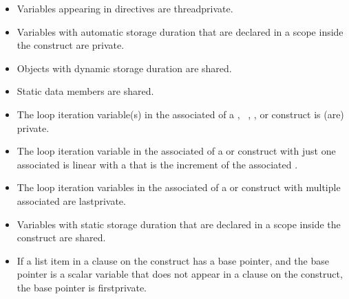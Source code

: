 \begin{ccppspecific}
\begin{itemize}
\item Variables appearing in  directives are threadprivate.

\item Variables with automatic storage duration that are declared in a scope inside the
construct are private.

\item Objects with dynamic storage duration are shared.

\item Static data members are shared.

\item The loop iteration variable(s) in the associated  of a
  , ~, , or  construct is (are) private.

\item The loop iteration variable in the associated  of a
   or   construct with just
one associated  is linear with a  that is the increment of
the associated .

\item The loop iteration variables in the associated  of a
 or  construct with multiple associated  are lastprivate.

\item Variables with static storage duration that are declared in a scope inside the construct
are shared.

\item If a list item in a  clause on the  construct has
a base pointer, and the base pointer is a
scalar variable that does not appear in a  clause on the construct,
the base pointer is firstprivate.

\end{itemize}
\end{ccppspecific}
%
